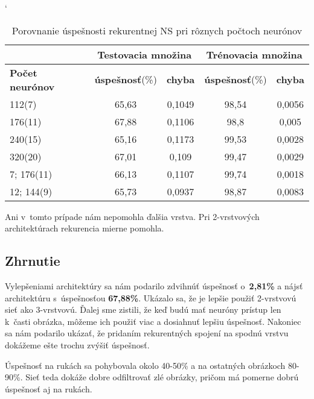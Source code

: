 \begin{table}[htp]
\catcode` %
\centering
\begin{tabular}{|l|c|c|c|c|}
\cline{2-5}
\multicolumn{1}{l}{} & \multicolumn{2}{|c|}{\textbf{Testovacia množina}} & \multicolumn{2}{c|}{\textbf{Trénovacia množina}}\\ 
\hline
\textbf{Počet neurónov} & \textbf{úspešnosť}(\%) & \textbf{chyba} & \textbf{úspešnosť}(\%) & \textbf{chyba} \\ \hline
112(7) & 65,63 & 0,1049 & 98,54 & 0,0056  \\ \hline
176(11) & 67,88 & 0,1106 & 98,8 & 0,005  \\ \hline
240(15) & 65,16 & 0,1173 & 99,53 & 0,0028  \\ \hline
320(20) & 67,01 & 0,109 & 99,47 & 0,0029 \\ \hline
7; 176(11) & 66,13 & 0,1107 & 99,74 & 0,0018 \\ \hline
12; 144(9) & 65,73 & 0,0937 & 98,87 & 0,0083 \\ \hline
\end{tabular}
\caption{Porovnanie úspešnosti rekurentnej NS pri rôznych počtoch neurónov}
\label{tab:neuroncountcmp3}
\end{table}

Ani v~tomto prípade nám nepomohla ďalšia vrstva. Pri 2-vrstvových architektúrach rekurencia mierne pomohla.

\subsection{Zhrnutie}

Vylepšeniami architektúry sa nám podarilo zdvihnúť úspešnosť o~\textbf{2,81\%} a nájsť architektúru s~úspešnosťou \textbf{67,88\%}. Ukázalo sa, že je lepšie použiť 2-vrstvovú sieť ako 3-vrstvovú. Ďalej sme zistili, že keď budú mať neuróny prístup len k~časti obrázka, môžeme ich použiť viac a dosiahnuť lepšiu úspešnosť. Nakoniec sa nám podarilo ukázať, že pridaním rekurentných spojení na spodnú vrstvu dokážeme ešte trochu zvýšiť úspešnosť.

Úspešnosť na rukách sa pohybovala okolo 40-50\% a na ostatných obrázkoch 80-90\%. Sieť teda dokáže dobre odfiltrovať zlé obrázky, pričom má pomerne dobrú úspešnosť aj na rukách.

